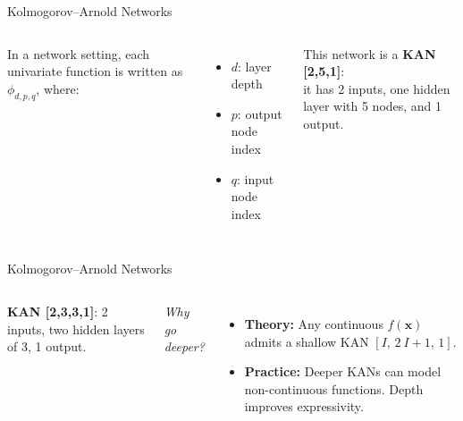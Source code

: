 \documentclass[aspectratio=169]{beamer}
\begin{document}
\begin{frame}{Kolmogorov–Arnold Networks}
	
	\begin{columns}[T,onlytextwidth]
		
		\centering
		\resizebox{!}{0.8\textheight}{}
		
		In a network setting, each univariate function is written as $\phi_{d,p,q}$, where:
		\vspace{0.8em}
		\begin{itemize}
			\item $d$: layer depth  
			\item $p$: output node index  
			\item $q$: input node index
		\end{itemize}
		
		\vspace{1em}
		This network is a \textbf{KAN [2,5,1]}:\\it has 2 inputs, one hidden layer with 5 nodes, and 1 output.
		
	\end{columns}
	
\end{frame}


\begin{frame}{Kolmogorov–Arnold Networks}
	\begin{columns}[T,onlytextwidth]
		
		\column{0.5\textwidth}
		\centering
		\resizebox{!}{0.8\textheight}{}
		
		\column{0.45\textwidth}
		\textbf{KAN [2,3,3,1]}: 2 inputs, two hidden layers of 3, 1 output.
		
		\vspace{0.8em}
		\textit{Why go deeper?}
		\begin{itemize}
			\item \textbf{Theory:} Any continuous $f(\mathbf{x})$ admits a shallow KAN $[I,\,2\ I + 1,\,1]$.
			\item \textbf{Practice:} Deeper KANs can model non-continuous functions. Depth improves expressivity.
		\end{itemize}
		
	\end{columns}
\end{frame}
\end{document}
